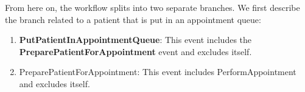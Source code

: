 From here on, the workflow splits into two separate branches. We first describe the branch related to a patient that is put in an appointment queue: 
\begin{enumerate}
\item \textbf{PutPatientInAppointmentQueue}: This event includes the \textbf{PreparePatientForAppointment} event and excludes itself.
\item PreparePatientForAppointment: This event includes PerformAppointment and excludes itself.
\end{enumerate}